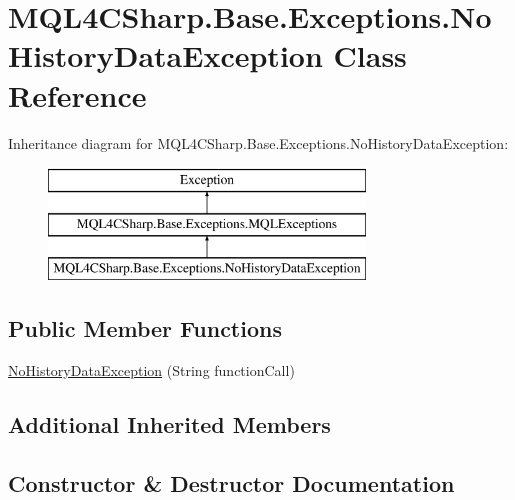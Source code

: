 \hypertarget{class_m_q_l4_c_sharp_1_1_base_1_1_exceptions_1_1_no_history_data_exception}{}\section{M\+Q\+L4\+C\+Sharp.\+Base.\+Exceptions.\+No\+History\+Data\+Exception Class Reference}
\label{class_m_q_l4_c_sharp_1_1_base_1_1_exceptions_1_1_no_history_data_exception}
Inheritance diagram for M\+Q\+L4\+C\+Sharp.\+Base.\+Exceptions.\+No\+History\+Data\+Exception\+:\begin{figure}[H]
\begin{center}
\leavevmode
\includegraphics[height=3.000000cm]{class_m_q_l4_c_sharp_1_1_base_1_1_exceptions_1_1_no_history_data_exception}
\end{center}
\end{figure}
\subsection*{Public Member Functions}
\begin{DoxyCompactItemize}
\item 
\hyperlink{class_m_q_l4_c_sharp_1_1_base_1_1_exceptions_1_1_no_history_data_exception_a77a039b0e97ce985f9c90b3a9902a33d}{No\+History\+Data\+Exception} (String function\+Call)
\end{DoxyCompactItemize}
\subsection*{Additional Inherited Members}


\subsection{Constructor \& Destructor Documentation}
